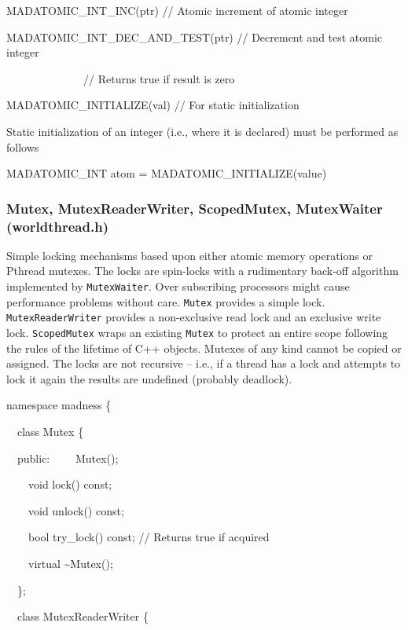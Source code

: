 \documentclass[letterpaper]{article}
\begin{document}
{\ttfamily
MADATOMIC\_INT\_INC(ptr) // Atomic increment of atomic integer}

{\ttfamily
MADATOMIC\_INT\_DEC\_AND\_TEST(ptr) // Decrement and test atomic integer}

{\ttfamily
\ \ \ \ \ \ \ \ \ \ \ \  \ \ // Returns true if result is zero}

{\ttfamily
MADATOMIC\_INITIALIZE(val) // For static initialization}


\bigskip

Static initialization of an integer (i.e., where it is declared) must be performed as follows

{\ttfamily
MADATOMIC\_INT atom = MADATOMIC\_INITIALIZE(value)}


\bigskip

\subsubsection{Mutex, MutexReaderWriter, ScopedMutex, MutexWaiter (worldthread.h)}
Simple locking mechanisms based upon either atomic memory operations or Pthread mutexes. The locks are spin-locks with a
rudimentary back-off algorithm implemented by \texttt{MutexWaiter}. Over subscribing processors might cause performance
problems without care. \texttt{Mutex} provides a simple lock. \texttt{MutexReaderWriter} provides a non-exclusive read
lock and an exclusive write lock. \texttt{ScopedMutex} wraps an existing \texttt{Mutex} to protect an entire scope
following the rules of the lifetime of C++ objects. Mutexes of any kind cannot be copied or assigned. The locks are not
recursive -- i.e., if a thread has a lock and attempts to lock it again the results are undefined (probably deadlock).

{\ttfamily
namespace madness \{}

{\ttfamily
\ \ class Mutex \{}

{\ttfamily
\ \ public:\newline
\ \ \ \ Mutex();}

{\ttfamily
\ \ \ \ void lock() const;}

{\ttfamily
\ \ \ \ void unlock() const;}

{\ttfamily
\ \ \ \ bool try\_lock() const; // Returns true if acquired}

{\ttfamily
\ \ \ \ virtual \~{}Mutex();}

{\ttfamily
\ \ \};}


\bigskip

{\ttfamily
\ \ class MutexReaderWriter \{}
\end{document}
